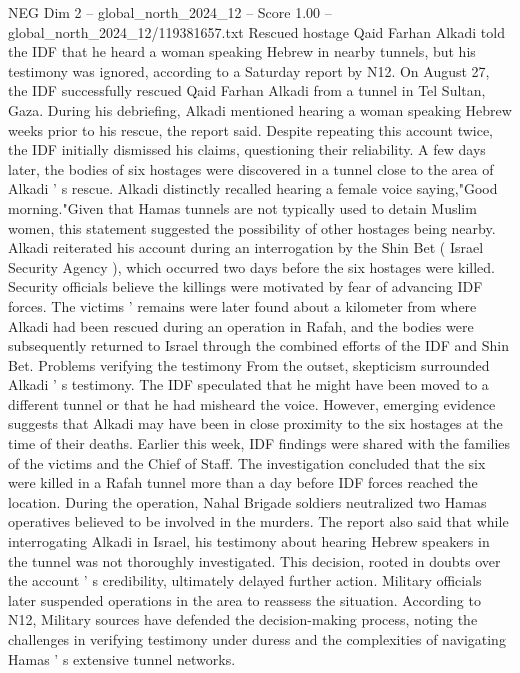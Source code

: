 \begin{textsample}{NEG Dim 2 – global\_north\_2024\_12 – Score 1.00 – global\_north\_2024\_12/119381657.txt}  \label{ex:f2_neg_170}
Rescued hostage Qaid Farhan Alkadi told the IDF that he heard a woman speaking Hebrew in nearby tunnels, but his testimony was ignored, according to a Saturday report by N12.
On August 27, the IDF successfully rescued Qaid Farhan Alkadi from a tunnel in Tel Sultan, Gaza.
During his debriefing, Alkadi mentioned hearing a woman speaking Hebrew weeks prior to his rescue, the report said.
Despite repeating this account twice, the IDF initially dismissed his claims, questioning their reliability.
A few days later, the bodies of six hostages were discovered in a tunnel close to the area of Alkadi ' s rescue.
Alkadi distinctly recalled hearing a female voice saying,"Good morning."Given that Hamas tunnels are not typically used to detain Muslim women, this statement suggested the possibility of other hostages being nearby.
Alkadi reiterated his account during an interrogation by the Shin Bet ( Israel Security Agency ), which occurred two days before the six hostages were killed.
Security officials believe the killings were motivated by fear of advancing IDF forces.
The victims ' remains were later found about a kilometer from where Alkadi had been rescued during an operation in Rafah, and the bodies were subsequently returned to Israel through the combined efforts of the IDF and Shin Bet.
Problems verifying the testimony From the outset, skepticism surrounded Alkadi ' s testimony.
The IDF speculated that he might have been moved to a different tunnel or that he had misheard the voice.
However, emerging evidence suggests that Alkadi may have been in close proximity to the six hostages at the time of their deaths.
Earlier this week, IDF findings were shared with the families of the victims and the Chief of Staff.
The investigation concluded that the six were killed in a Rafah tunnel more than a day before IDF forces reached the location.
During the operation, Nahal Brigade soldiers neutralized two Hamas operatives believed to be involved in the murders.
The report also said that while interrogating Alkadi in Israel, his testimony about hearing Hebrew speakers in the tunnel was not thoroughly investigated.
This decision, rooted in doubts over the account ' s credibility, ultimately delayed further action.
Military officials later suspended operations in the area to reassess the situation.
According to N12, Military sources have defended the decision-making process, noting the challenges in verifying testimony under duress and the complexities of navigating Hamas ' s extensive tunnel networks.

\end{textsample}
